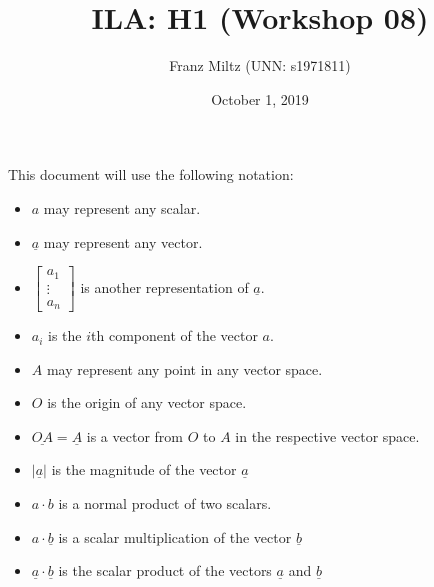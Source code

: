 \documentclass{article}
\title{ILA: H1 (Workshop 08)}
\author{Franz Miltz (UNN: s1971811)}
\date{October 1, 2019}
\renewcommand{\vec}{\underline}
\begin{document}
\maketitle
This document will use the following notation:
\begin{itemize}
    \item $a$ may represent any scalar.
    \item $\vec{a}$ may represent any vector.
    \item $\begin{bmatrix}
        a_1\\
        \vdots\\
        a_n
    \end{bmatrix}$ is another representation of $\vec a$. 
    \item $a_i$ is the $i$th component of the vector $a$.
    \item $A$ may represent any point in any vector space.
    \item $O$ is the origin of any vector space.
    \item $\vec{OA}=\vec{A}$ is a vector from $O$ to $A$ in the respective vector space.
    \item $\vert\vec{a}\vert$ is the magnitude of the vector $\vec{a}$
    \item $a\cdot b$ is a normal product of two scalars.
    \item $a\cdot\vec{b}$ is a scalar multiplication of the vector $\vec{b}$
    \item $\vec{a}\cdot\vec{b}$ is the scalar product of the vectors $\vec{a}$ and $\vec{b}$
\end{itemize}
\end{document}
